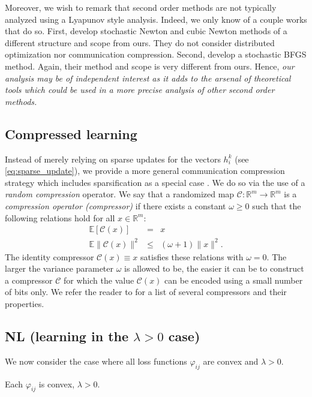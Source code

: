 \documentclass[12pt]{article}
\newcommand{\R}{\mathbb{R}}
\newcommand{\cC}{{\mathcal{C}}}
\begin{document}
Moreover, we wish to remark that second order methods are not typically analyzed using a Lyapunov style analysis. Indeed, we only know of a couple works that do so.  First, \citet{SN2019} develop stochastic Newton and cubic Newton methods of a different structure and scope from ours. They do not consider distributed optimization nor communication compression. Second, \citet{RBFGS2020} develop a stochastic BFGS method. Again, their method and scope is very different from ours. Hence, {\em our analysis may be of independent interest as it  adds to the arsenal of theoretical tools which could be used in a more precise analysis of other second order methods.}


\subsection{Compressed learning}

Instead of merely relying on sparse updates for the vectors $h_i^k$ (see \eqref{eq:sparse_update}), we provide a more general communication compression strategy which includes sparsification as a special case \citep{Alistarh17}. We do so via the use of a {\em random compression} operator.  We say that a randomized map $\cC:\R^m\to \R^m$ is  a {\em compression operator (compressor)} if  there exists a constant $\omega \geq 0$ such that the following relations hold for all $x\in \R^m$:
\begin{eqnarray} 
\mathbb{E}[\cC(x) ] &=& x \label{eq:unbiased} \\ 
\mathbb{E}\|\cC(x)\|^2 &\leq &(\omega + 1)\|x\|^2.\label{eq:omega-variance}
\end{eqnarray} 
The identity compressor $\cC(x)\equiv x$ satisfies these relations with $\omega=0$. The larger the variance parameter $\omega$ is allowed to be, the easier it can be to construct a compressor $\cC$ for which the value $\cC(x)$ can be encoded using a small number of bits only. We refer the reader to \citep{biased2020} for a list of several compressors and their properties.


\subsection{{\sf NL} (learning in the $\lambda > 0$ case)} \label{subsec:NL1}

We now consider  the case where all loss functions $\varphi_{ij}$ are convex and $\lambda >0$.
\begin{assumption}\label{as:learning-1}
Each $\varphi_{ij}$ is convex, $\lambda>0$.
\end{assumption}
\end{document}
